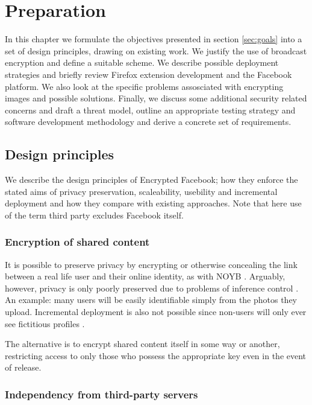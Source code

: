 \chapter{Preparation}\label{ch:preparation}

In this chapter we formulate the objectives presented in section \ref{sec:goals} into a set of design principles, drawing on existing work. We justify the use of broadcast encryption and define a suitable scheme. We describe possible deployment strategies and briefly review Firefox extension development and the Facebook platform. We also look at the specific problems assosciated with encrypting images and possible solutions. Finally, we discuss some additional security related concerns and draft a threat model, outline an appropriate testing strategy and software development methodology and derive a concrete set of requirements.


\FloatBarrier
\section{Design principles}

We describe the design principles of Encrypted Facebook; how they enforce the stated aims of privacy preservation, scaleability, usebility and incremental deployment and how they compare with existing approaches. Note that here use of the term third party excludes Facebook itself.


\FloatBarrier
\subsection{Encryption of shared content}

It is possible to preserve privacy by encrypting or otherwise concealing the link between a real life user and their online identity, as with NOYB \cite{noyb}. Arguably, however, privacy is only poorly preserved due to problems of inference control \cite{ross}. An example: many users will be easily identifiable simply from the photos they upload. Incremental deployment is also not possible since non-users will only ever see fictitious profiles \cite{facecloak}.

The alternative is to encrypt shared content itself in some way or another, restricting access to only those who possess the appropriate key even in the event of release.


\FloatBarrier
\subsection{Independency from third-party servers}

